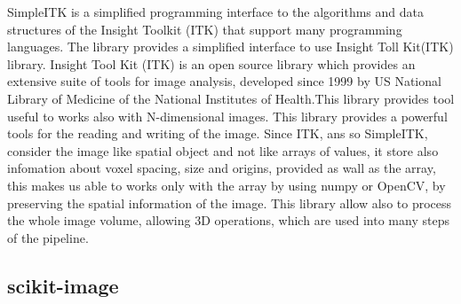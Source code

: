 \documentclass{standalone}
\begin{document}
	SimpleITK is a simplified programming interface to the algorithms and data structures of the Insight Toolkit (ITK) that support many programming languages. The library provides a simplified interface to use Insight Toll Kit(ITK) library. 
	Insight Tool Kit (ITK) is an open source library which provides an extensive suite of tools for image analysis, developed since 1999 by US National Library of Medicine of the National Institutes of Health.This library provides tool useful to works also with N-dimensional images. 
	This library provides a powerful tools for the reading and writing of the image. Since ITK, ans so SimpleITK,  consider the image like spatial object and not like arrays of values, it store also infomation about voxel spacing, size and origins, provided as wall as the array, this makes us able to works only with the array by using numpy or OpenCV, by preserving the spatial information of the image. This library allow also to process the whole image volume, allowing 3D operations, which are used into many steps of the pipeline.
	
	 \subsection{scikit-image}
	
	 
\end{document}
